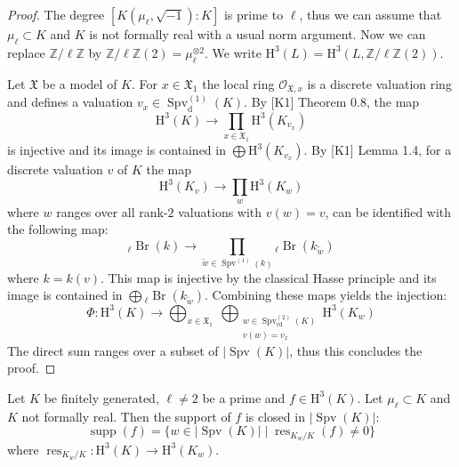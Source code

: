 \begin{proof}
The degree $[K(\mu_\ell, \sqrt{-1}):K]$ is prime to $\ell$, thus we can assume that $\mu_\ell\subset K$ and $K$ is not formally real with a usual norm argument. Now we can replace $\mathbb{Z}/\ell\mathbb{Z}$ by $\mathbb{Z}/\ell\mathbb{Z}(2) = \mu_\ell^{\otimes 2}$. We write $\mathrm{H}^3(L) = \mathrm{H}^3(L, \mathbb{Z}/\ell\mathbb{Z}(2))$. 

Let $\mathfrak{X}$ be a model of $K$. For $x\in\mathfrak{X}_1$ the local ring $\mathcal{O}_{\mathfrak{X}, x}$ is a discrete valuation ring and defines a valuation $v_x\in\operatorname{Spv}_\text{d}^{(1)}(K)$. By [K1] Theorem 0.8, the map
\[ \mathrm{H}^3(K)\longrightarrow \prod_{x\in\mathfrak{X}_1}\mathrm{H}^3(K_{v_x}) \]
is injective and its image is contained in $\bigoplus \mathrm{H}^3(K_{v_x})$. By [K1] Lemma 1.4, for a discrete valuation $v$ of $K$ the map
\[ \mathrm{H}^3(K_v) \longrightarrow \prod_w\mathrm{H}^3(K_w) \]
where $w$ ranges over all rank-$2$ valuations with $v(w) = v$, can be identified with the following map:
\[ {}_\ell\operatorname{Br}(k) \longrightarrow \prod_{\tilde{w}\in\operatorname{Spv}^{(1)}(k)} {}_\ell\operatorname{Br}(k_{\tilde{w}}) \]
where $k = k(v)$. This map is injective by the classical Hasse principle and its image is contained in $\bigoplus {}_\ell\operatorname{Br}(k_{\tilde{w}})$. Combining these maps yields the injection:
\[\Phi: \mathrm{H}^3(K)\longrightarrow \bigoplus_{x\in\mathfrak{X}_1}\  \bigoplus_{\substack{w\in\operatorname{Spv}_\text{rd}^{(2)}(K) \\ v(w) = v_x}} \mathrm{H}^3(K_w) \]
The direct sum ranges over a subset of $|\operatorname{Spv}(K)|$, thus this concludes the proof. 
\end{proof}

\begin{lemma}\label{2.4-closedset}
Let $K$ be finitely generated, $\ell\neq 2$ be a prime and $f\in\mathrm{H}^3(K)$. Let $\mu_\ell\subset K$ and $K$ not formally real. Then the support of $f$ is closed in $|\operatorname{Spv}(K)|$:
\[ \operatorname{supp}(f) = \{w\in |\operatorname{Spv}(K)|\mid \operatorname{res}_{K_w/K}(f)\neq 0 \} \]
where $\operatorname{res}_{K_w/K}: \mathrm{H}^3(K)\to \mathrm{H}^3(K_w)$.
\end{lemma}

